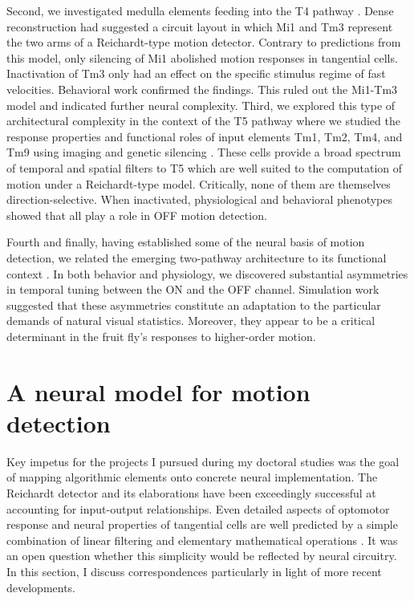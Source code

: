Second, we investigated medulla elements feeding into the T4 pathway \citep{Ammer:2015jo}. Dense reconstruction had suggested a circuit layout in which Mi1 and Tm3 represent the two arms of a Reichardt-type motion detector. Contrary to predictions from this model, only silencing of Mi1 abolished motion responses in tangential cells. Inactivation of Tm3 only had an effect on the specific stimulus regime of fast velocities. Behavioral work confirmed the findings. This ruled out the Mi1-Tm3 model and indicated further neural complexity. Third, we explored this type of architectural complexity in the context of the T5 pathway where we studied the response properties and functional roles of input elements Tm1, Tm2, Tm4, and Tm9 using imaging and genetic silencing \citep{Serbe:2016ew}. These cells provide a broad spectrum of temporal and spatial filters to T5 which are well suited to the computation of motion under a Reichardt-type model. Critically, none of them are themselves direction-selective. When inactivated, physiological and behavioral phenotypes showed that all play a role in OFF motion detection. 

Fourth and finally, having established some of the neural basis of motion detection, we related the emerging two-pathway architecture to its functional context \citep{Leonhardt:2016ex}. In both behavior and physiology, we discovered substantial asymmetries in temporal tuning between the ON and the OFF channel. Simulation work suggested that these asymmetries constitute an adaptation to the particular demands of natural visual statistics. Moreover, they appear to be a critical determinant in the fruit fly's responses to higher-order motion.

\section{A neural model for motion detection}
Key impetus for the projects I pursued during my doctoral studies was the goal of mapping algorithmic elements onto concrete neural implementation. The Reichardt detector and its elaborations have been exceedingly successful at accounting for input-output relationships. Even detailed aspects of optomotor response and neural properties of tangential cells are well predicted by a simple combination of linear filtering and elementary mathematical operations \citep{Borst:1989vp,Borst:2002iw}. It was an open question whether this simplicity would be reflected by neural circuitry. In this section, I discuss correspondences particularly in light of more recent developments.

